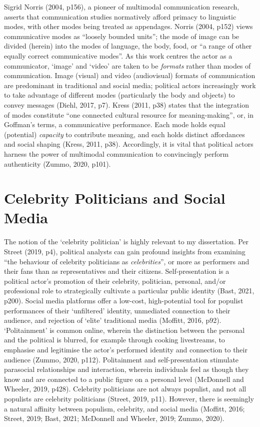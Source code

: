 \documentclass[a4paper, nobind]{templates/ociamthesis}
\begin{document}
Sigrid Norris (2004, p156), a pioneer of multimodal communication research, asserts that communication studies normatively afford primacy to linguistic modes, with other modes being treated as appendages. Norris (2004, p152) views communicative modes as ``loosely bounded units''; the mode of image can be divided (herein) into the modes of language, the body, food, or ``a range of other equally correct communicative modes''. As this work centres the actor as a communicator, `image' and `video' are taken to be \emph{formats} rather than modes of communication.
Image (visual) and video (audiovisual) formats of communication are predominant in traditional and social media; political actors increasingly work to take advantage of different modes (particularly the body and objects) to convey messages (Diehl, 2017, p7). Kress (2011, p38) states that the integration of modes constitute ``one connected cultural resource for meaning-making'', or, in Goffman's terms, a communicative performance. Each mode holds equal (potential) \emph{capacity} to contribute meaning, and each holds distinct affordances and social shaping (Kress, 2011, p38). Accordingly, it is vital that political actors harness the power of multimodal communication to convincingly perform authenticity (Zummo, 2020, p101).

\hypertarget{celebrity-politicians-and-social-media}{%
\section{Celebrity Politicians and Social Media}\label{celebrity-politicians-and-social-media}}

The notion of the `celebrity politician' is highly relevant to my dissertation. Per Street (2019, p4), political analysts can gain profound insights from examining ``the behaviour of celebrity politicians as \emph{celebrities}'', or more as performers and their fans than as representatives and their citizens. Self-presentation is a political actor's promotion of their celebrity, politician, personal, and/or professional role to strategically cultivate a particular public identity (Bast, 2021, p200). Social media platforms offer a low-cost, high-potential tool for populist performances of their `unfiltered' identity, unmediated connection to their audience, and rejection of `elite' traditional media (Moffitt, 2016, p92). `Politainment' is common online, wherein the distinction between the personal and the political is blurred, for example through cooking livestreams, to emphasise and legitimise the actor's performed identity and connection to their audience (Zummo, 2020, p112). Politainment and self-presentation stimulate parasocial relationships and interaction, wherein individuals feel as though they know and are connected to a public figure on a personal level (McDonnell and Wheeler, 2019, p428). Celebrity politicians are not always populist, and not all populists are celebrity politicians (Street, 2019, p11). However, there is seemingly a natural affinity between populism, celebrity, and social media (Moffitt, 2016; Street, 2019; Bast, 2021; McDonnell and Wheeler, 2019; Zummo, 2020).
\end{document}
